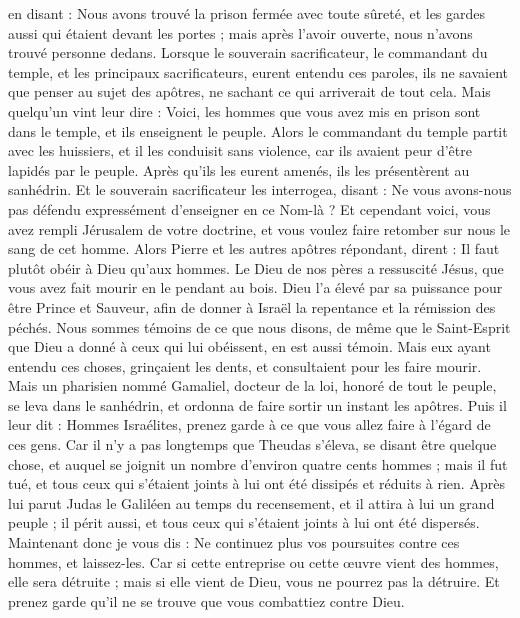 \begin{multicols}{2}
en disant : Nous avons trouvé la prison fermée avec toute sûreté, et les gardes aussi qui étaient devant les portes ; mais après l'avoir ouverte, nous n'avons trouvé personne dedans.
Lorsque le souverain sacrificateur, le commandant du temple, et les principaux sacrificateurs, eurent entendu ces paroles, ils ne savaient que penser au sujet des apôtres, ne sachant ce qui arriverait de tout cela.
Mais quelqu'un vint leur dire : Voici, les hommes que vous avez mis en prison sont dans le temple, et ils enseignent le peuple.
Alors le commandant du temple partit avec les huissiers, et il les conduisit sans violence, car ils avaient peur d'être lapidés par le peuple.
Après qu’ils les eurent amenés, ils les présentèrent au sanhédrin. Et le souverain sacrificateur les interrogea,
disant : Ne vous avons-nous pas défendu expressément d'enseigner en ce Nom-là ? Et cependant voici, vous avez rempli Jérusalem de votre doctrine, et vous voulez faire retomber sur nous le sang de cet homme.
Alors Pierre et les autres apôtres répondant, dirent : Il faut plutôt obéir à Dieu qu'aux hommes.
Le Dieu de nos pères a ressuscité Jésus, que vous avez fait mourir en le pendant au bois.
Dieu l’a élevé par sa puissance pour être Prince et Sauveur, afin de donner à Israël la repentance et la rémission des péchés.
Nous sommes témoins de ce que nous disons, de même que le Saint-Esprit que Dieu a donné à ceux qui lui obéissent, en est aussi témoin.
Mais eux ayant entendu ces choses, grinçaient les dents, et consultaient pour les faire mourir.
Mais un pharisien nommé Gamaliel, docteur de la loi, honoré de tout le peuple, se leva dans le sanhédrin, et ordonna de faire sortir un instant les apôtres.
Puis il leur dit : Hommes Israélites, prenez garde à ce que vous allez faire à l’égard de ces gens.
Car il n’y a pas longtemps que Theudas s'éleva, se disant être quelque chose, et auquel se joignit un nombre d’environ quatre cents hommes ; mais il fut tué, et tous ceux qui s'étaient joints à lui ont été dissipés et réduits à rien.
Après lui parut Judas le Galiléen au temps du recensement, et il attira à lui un grand peuple ; il périt aussi, et tous ceux qui s'étaient joints à lui ont été dispersés.
Maintenant donc je vous dis : Ne continuez plus vos poursuites contre ces hommes, et laissez-les. Car si cette entreprise ou cette œuvre vient des hommes, elle sera détruite ;
mais si elle vient de Dieu, vous ne pourrez pas la détruire. Et prenez garde qu’il ne se trouve que vous combattiez contre Dieu.

\end{multicols}

